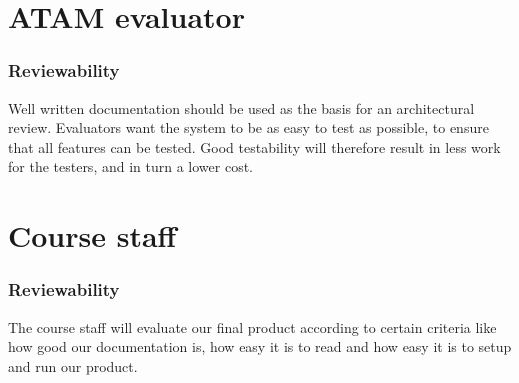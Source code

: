    
    \section{ATAM evaluator}
        \subsubsection*{Reviewability}
        Well written documentation should be used as the basis for an architectural review. Evaluators want the system to be as easy to test as possible, to ensure that all features can be tested. Good testability will therefore result in less work for the testers, and in turn a lower cost.


    \section{Course staff}
        \subsubsection*{Reviewability}
        The course staff will evaluate our final product according to certain criteria like how good our documentation is, how easy it is to read and how easy it is to setup and run our product.